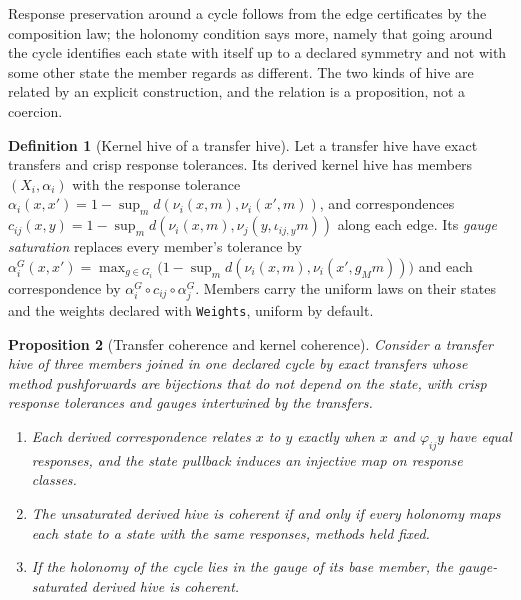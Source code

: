 \documentclass[11pt]{article}
\newcommand{\code}[1]{\texttt{#1}}
\theoremstyle{definition}
\newtheorem{definition}{Definition}[section]
\theoremstyle{plain}
\newtheorem{proposition}[definition]{Proposition}
\begin{document}
Response preservation around a cycle follows from the edge certificates by the composition law; the
holonomy condition says more, namely that going around the cycle identifies each state with itself
up to a declared symmetry and not with some other state the member regards as different. The two
kinds of hive are related by an explicit construction, and the relation is a proposition, not a
coercion.

\begin{definition}[Kernel hive of a transfer hive]\label{def:kernelof}
Let a transfer hive have exact transfers and crisp response tolerances. Its derived kernel hive has
members $(X_i,\alpha_i)$ with the response tolerance
$\alpha_i(x,x')=1-\sup_m d(\nu_i(x,m),\nu_i(x',m))$, and correspondences
$c_{ij}(x,y)=1-\sup_m d(\nu_i(x,m),\nu_j(y,\iota_{ij,y}m))$ along each edge. Its
\emph{gauge saturation} replaces every member's tolerance by
$\alpha^G_i(x,x')=\max_{g\in G_i}\bigl(1-\sup_m d(\nu_i(x,m),\nu_i(x',g_Mm))\bigr)$ and each
correspondence by $\alpha^G_i\circ c_{ij}\circ\alpha^G_j$. Members carry the uniform laws on their
states and the weights declared with \code{Weights}, uniform by default.
\end{definition}

\begin{proposition}[Transfer coherence and kernel coherence]\label{prop:kernelof}
Consider a transfer hive of three members joined in one declared cycle by exact transfers whose
method pushforwards are bijections that do not depend on the state, with crisp response
tolerances and gauges intertwined by the transfers.
\begin{enumerate}
\item Each derived correspondence relates $x$ to $y$ exactly when $x$ and $\varphi_{ij}y$ have equal
responses, and the state pullback induces an injective map on response classes.
\item The unsaturated derived hive is coherent if and only if every holonomy maps each state to a
state with the same responses, methods held fixed.
\item If the holonomy of the cycle lies in the gauge of its base member, the gauge-saturated
derived hive is coherent.
\end{enumerate}
\end{proposition}
\end{document}
